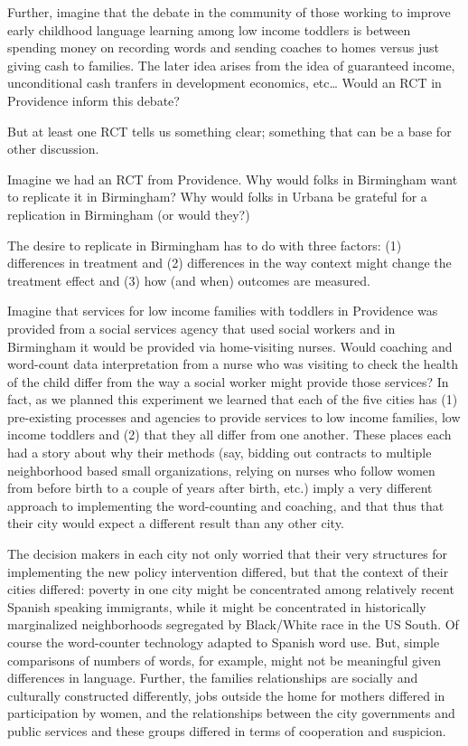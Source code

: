 \documentclass[
]{article}
\begin{document}
Further, imagine that the debate in the community of those working to
improve early childhood language learning among low income toddlers is
between spending money on recording words and sending coaches to homes
versus just giving cash to families. The later idea arises from the idea
of guaranteed income, unconditional cash tranfers in development
economics, etc\ldots{} Would an RCT in Providence inform this debate?

But at least one RCT tells us something clear; something that can be a
base for other discussion.

Imagine we had an RCT from Providence. Why would folks in Birmingham
want to replicate it in Birmingham? Why would folks in Urbana be
grateful for a replication in Birmingham (or would they?)

The desire to replicate in Birmingham has to do with three factors: (1)
differences in treatment and (2) differences in the way context might
change the treatment effect and (3) how (and when) outcomes are
measured.

Imagine that services for low income families with toddlers in
Providence was provided from a social services agency that used social
workers and in Birmingham it would be provided via home-visiting nurses.
Would coaching and word-count data interpretation from a nurse who was
visiting to check the health of the child differ from the way a social
worker might provide those services? In fact, as we planned this
experiment we learned that each of the five cities has (1) pre-existing
processes and agencies to provide services to low income families, low
income toddlers and (2) that they all differ from one another. These
places each had a story about why their methods (say, bidding out
contracts to multiple neighborhood based small organizations, relying on
nurses who follow women from before birth to a couple of years after
birth, etc.) imply a very different approach to implementing the
word-counting and coaching, and that thus that their city would expect a
different result than any other city.

The decision makers in each city not only worried that their very
structures for implementing the new policy intervention differed, but
that the context of their cities differed: poverty in one city might be
concentrated among relatively recent Spanish speaking immigrants, while
it might be concentrated in historically marginalized neighborhoods
segregated by Black/White race in the US South. Of course the
word-counter technology adapted to Spanish word use. But, simple
comparisons of numbers of words, for example, might not be meaningful
given differences in language. Further, the families relationships are
socially and culturally constructed differently, jobs outside the home
for mothers differed in participation by women, and the relationships
between the city governments and public services and these groups
differed in terms of cooperation and suspicion.
\end{document}
